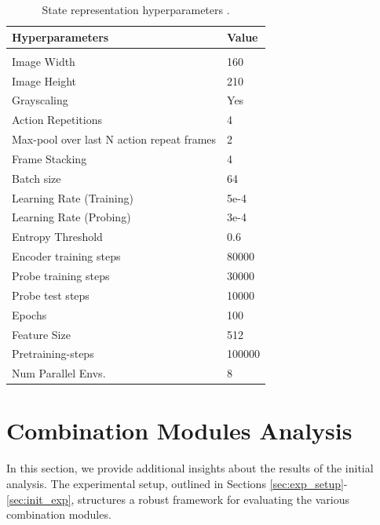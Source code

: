 \begin{table}[htbp]
    \centering
        \begin{tabular}{ll}
            \multicolumn{1}{l}{\bf Hyperparameters}  &\multicolumn{1}{l}{\bf Value}
            \\ \hline \\
            Image Width  & 160 \\
            Image Height & 210 \\
            Grayscaling & Yes \\
            Action Repetitions & 4 \\
            Max-pool over last N action repeat frames & 2 \\
            Frame Stacking & 4 \\
            Batch size & 64 \\
            Learning Rate (Training) & 5e-4 \\
            Learning Rate (Probing) & 3e-4 \\
            Entropy Threshold & 0.6 \\
            Encoder training steps & 80000 \\
            Probe training steps & 30000  \\
            Probe test steps & 10000  \\
            Epochs & 100 \\
            Feature Size & 512 \\
            Pretraining-steps & 100000 \\
            Num Parallel Envs. & 8 \\
            
        \end{tabular}
        \caption{State representation hyperparameters \citep{anand2019unsupervised}.} \label{tab:state_hp}
\end{table}

\pagebreak


\section{Combination Modules Analysis} \label{sec:app-com-mod}
In this section, we provide additional insights about the results of the initial analysis. 
The experimental setup, outlined in Sections \ref{sec:exp_setup}-\ref{sec:init_exp}, structures a robust framework for evaluating the various combination modules.

